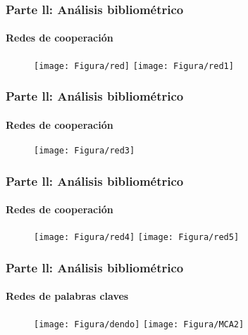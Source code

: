 \documentclass[11pt]{beamer}
\begin{document}
\begin{frame}
\frametitle{Parte ll: Análisis bibliométrico}
\framesubtitle{Redes de cooperación}

\begin{figure}
{\texttt{[image: Figura/red]}} 	{\texttt{[image: Figura/red1]}}	\\
	\end{figure}
\end{frame}

\begin{frame}
\frametitle{Parte ll: Análisis bibliométrico}
\framesubtitle{Redes de cooperación}

\begin{figure}
 	{\texttt{[image: Figura/red3]}}	\\
	\end{figure}
\end{frame}

\begin{frame}
\frametitle{Parte ll: Análisis bibliométrico}
\framesubtitle{Redes de cooperación}

\begin{figure}
{\texttt{[image: Figura/red4]}} 	{\texttt{[image: Figura/red5]}}	\\
	\end{figure}
\end{frame}

\begin{frame}
\frametitle{Parte ll: Análisis bibliométrico}
\framesubtitle{Redes de palabras claves}

\begin{figure}
{\texttt{[image: Figura/dendo]}} 	{\texttt{[image: Figura/MCA2]}}	\\
	\end{figure}
\end{frame}
\end{document}
